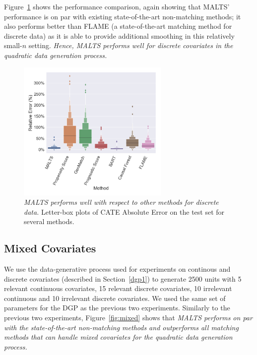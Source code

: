 Figure~\ref{fig:discrete} shows the performance comparison, again showing that 
MALTS' performance is on par with existing state-of-the-art non-matching methods; it also performs better than FLAME (a state-of-the-art matching method for discrete data) as it is able to provide additional smoothing in this relatively small-$n$ setting. \textit{Hence, MALTS performs well for discrete covariates in the quadratic data generation process.}
\begin{figure}
     \centering
    \includegraphics[width=0.65\textwidth]{Figures/boxplot_multifold_malts_discrete.png}    \caption{{\textit{\it MALTS performs well with respect to other methods for discrete data.}} Letter-box plots of CATE Absolute Error on the test set for several methods.}
    \label{fig:discrete}
\end{figure}


\subsection{Mixed Covariates}
We use the data-generative process used for experiments on continous and discrete covariates (described in Section~\ref{dgp1}) to generate 2500 units with 5 relevant continuous covariates, 15 relevant discrete covariates, 10 irrelevant continuous and 10 irrelevant discrete covariates. We used the same set of parameters for the DGP as the previous two experiments. Similarly to the previous two experiments, Figure~\ref{fig:mixed} shows that \textit{MALTS performs on par with the state-of-the-art non-matching methods and outperforms all matching methods that can handle mixed covariates for the quadratic data generation process.}

